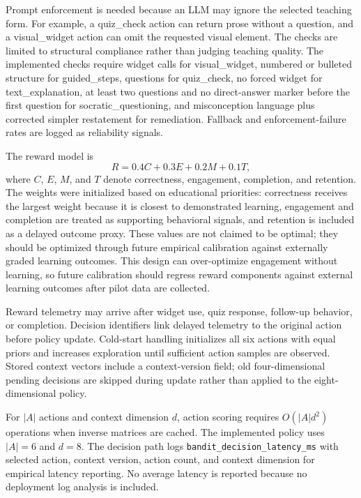 \documentclass[conference]{IEEEtran}
\begin{document}
Prompt enforcement is needed because an LLM may ignore the selected teaching form. For example, a quiz\_check action can return prose without a question, and a visual\_widget action can omit the requested visual element. The checks are limited to structural compliance rather than judging teaching quality. The implemented checks require widget calls for visual\_widget, numbered or bulleted structure for guided\_steps, questions for quiz\_check, no forced widget for text\_explanation, at least two questions and no direct-answer marker before the first question for socratic\_questioning, and misconception language plus corrected simpler restatement for remediation. Fallback and enforcement-failure rates are logged as reliability signals.

The reward model is
\begin{equation}
R = 0.4C + 0.3E + 0.2M + 0.1T,
\end{equation}
where $C$, $E$, $M$, and $T$ denote correctness, engagement, completion, and retention. The weights were initialized based on educational priorities: correctness receives the largest weight because it is closest to demonstrated learning, engagement and completion are treated as supporting behavioral signals, and retention is included as a delayed outcome proxy. These values are not claimed to be optimal; they should be optimized through future empirical calibration against externally graded learning outcomes. This design can over-optimize engagement without learning, so future calibration should regress reward components against external learning outcomes after pilot data are collected.

Reward telemetry may arrive after widget use, quiz response, follow-up behavior, or completion. Decision identifiers link delayed telemetry to the original action before policy update. Cold-start handling initializes all six actions with equal priors and increases exploration until sufficient action samples are observed. Stored context vectors include a context-version field; old four-dimensional pending decisions are skipped during update rather than applied to the eight-dimensional policy.

For $|A|$ actions and context dimension $d$, action scoring requires $O(|A|d^2)$ operations when inverse matrices are cached. The implemented policy uses $|A| = 6$ and $d = 8$. The decision path logs \texttt{bandit\_decision\_latency\_ms} with selected action, context version, action count, and context dimension for empirical latency reporting. No average latency is reported because no deployment log analysis is included.
\end{document}
